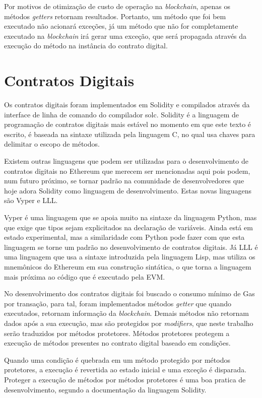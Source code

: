 \documentclass[tcc,capa]{texufpel}
\begin{document}
    Por motivos de otimização de custo de operação na \textit{blockchain}, apenas os métodos \textit{getters} retornam resultados. Portanto, um método que foi bem executado não acionará exceções, já um método que não for completamente executado na \textit{blockchain} irá gerar uma exceção, que será propagada através da execução do método na instância do contrato digital.
    
    \section{Contratos Digitais}
    
    Os contratos digitais foram implementados em Solidity e compilados através da interface de linha de comando do compilador solc. Solidity é a linguagem de programação de contratos digitais mais estável no momento em que este texto é escrito, é baseada na sintaxe utilizada pela linguagem C, no qual usa chaves para delimitar o escopo de métodos.
    
    Existem outras linguagens que podem ser utilizadas para o desenvolvimento de contratos digitais no Ethereum que merecem ser mencionadas aqui pois podem, num futuro próximo, se tornar padrão na comunidade de desenvolvedores que hoje adora Solidity como linguagem de desenvolvimento. Estas novas linguagens são Vyper e LLL.
    
    Vyper é uma linguagem que se apoia muito na sintaxe da linguagem Python, mas que exige que tipos sejam explicitados na declaração de variáveis. Ainda está em estado experimental, mas a similaridade com Python pode fazer com que esta linguagem se torne um padrão no desenvolvimento de contratos digitais. Já LLL é uma linguagem que usa a sintaxe introduzida pela linguagem Lisp, mas utiliza os mnemônicos do Ethereum em sua construção sintática, o que torna a linguagem mais próxima ao código que é executado pela EVM.
    
    No desenvolvimento dos contratos digitais foi buscado o consumo mínimo de Gas por transação, para tal, foram implementados métodos \textit{getter} que quando executados, retornam informação da \textit{blockchain}. Demais métodos não retornam dados após a sua execução, mas são protegidos por \textit{modifiers}, que neste trabalho serão traduzidos por métodos protetores. Métodos protetores protegem a execução de métodos presentes no contrato digital baseado em condições.
    
    Quando uma condição é quebrada em um método protegido por métodos protetores, a execução é revertida ao estado inicial e uma exceção é disparada. Proteger a execução de métodos por métodos protetores é uma boa pratica de desenvolvimento, segundo a documentação da linguagem Solidity.
    
\end{document}
